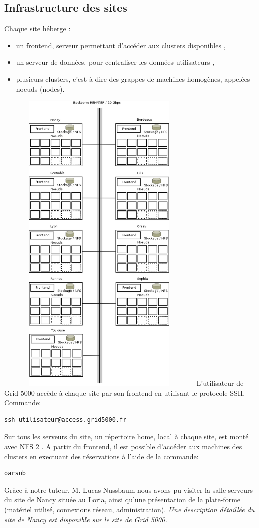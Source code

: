   \subsection{Infrastructure des sites}
Chaque site héberge :
\begin{itemize}
\item un frontend, serveur permettant d'accéder aux clusters disponibles ,
\item un serveur de données, pour centraliser les données utilisateurs ,
\item plusieurs clusters, c'est-à-dire des grappes de machines homogènes, appelées noeuds (nodes).
\end{itemize}
\includegraphics[width=10cm,height=15cm]{images/g5k1.png}
L'utilisateur de Grid 5000 accède à chaque site par son frontend en utilisant le protocole SSH.\\
Commande:
\begin{lstlisting}
ssh utilisateur@access.grid5000.fr
\end{lstlisting}
Sur tous les serveurs du site, un répertoire home, local à chaque site, est monté avec NFS 2 .
A partir du frontend, il est possible d'accéder aux machines des clusters en exectuant des réservations à l'aide de la commande:
\begin{lstlisting}
oarsub
\end{lstlisting}
Gràce à notre tuteur, M. Lucas Nussbaum nous avons pu visiter la salle serveurs du site de Nancy située au Loria, 
ainsi qu'une présentation de la plate-forme (matériel utilisé, connexions réseau,
administration).
\quotation\textit{Une description détaillée du site de Nancy est disponible sur le site de Grid 5000.}

